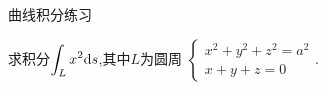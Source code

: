 \documentclass{ctexart}
\begin{document}
\pagestyle{empty}
\begin{center}\large 曲线积分练习\end{center}
\begin{problem}[1.]
    求积分$\displaystyle\int_{L}x^2\mathrm{d} s$,其中$L$为圆周
    $\left\{\begin{array}{l}
        x^2+y^2+z^2=a^2\\x+y+z=0
    \end{array}\right.$.
\end{problem}
\begin{solution}

\end{solution}
\end{document}
